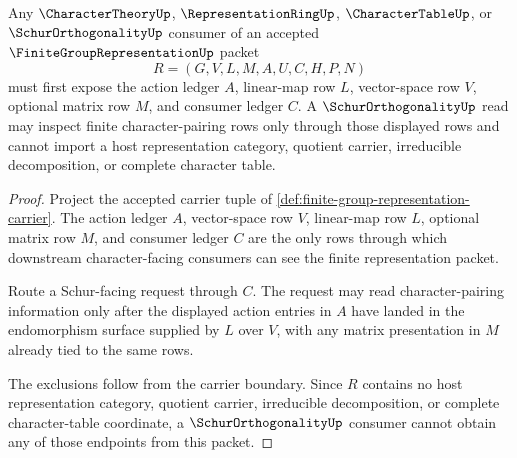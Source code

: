 
\begin{theorem}
\label{thm:finite-group-representation-schur-consumer-boundary}
Any $\CharacterTheoryUp$, $\RepresentationRingUp$, $\CharacterTableUp$, or $\SchurOrthogonalityUp$ consumer of an accepted $\FiniteGroupRepresentationUp$ packet
$$
R=(G,V,L,M,A,U,C,H,P,N)
$$
must first expose the action ledger $A$, linear-map row $L$, vector-space row $V$, optional matrix row $M$, and consumer ledger $C$. A $\SchurOrthogonalityUp$ read may inspect finite character-pairing rows only through those displayed rows and cannot import a host representation category, quotient carrier, irreducible decomposition, or complete character table.
\end{theorem}
\begin{proof}
Project the accepted carrier tuple of \autoref{def:finite-group-representation-carrier}. The action ledger $A$, vector-space row $V$, linear-map row $L$, optional matrix row $M$, and consumer ledger $C$ are the only rows through which downstream character-facing consumers can see the finite representation packet.

Route a Schur-facing request through $C$. The request may read character-pairing information only after the displayed action entries in $A$ have landed in the endomorphism surface supplied by $L$ over $V$, with any matrix presentation in $M$ already tied to the same rows.

The exclusions follow from the carrier boundary. Since $R$ contains no host representation category, quotient carrier, irreducible decomposition, or complete character-table coordinate, a $\SchurOrthogonalityUp$ consumer cannot obtain any of those endpoints from this packet.
\end{proof}


